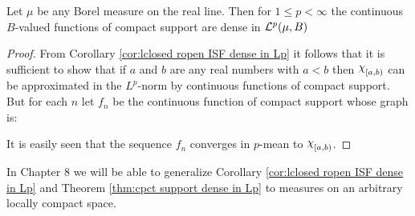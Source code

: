 \begin{theorem}
\label{thm:cpct support dense in Lp}
Let $\mu$ be any Borel measure on the real line. Then for $1\leq p<\infty$ the continuous $B$-valued functions of compact support are dense in ${\cal L}^p(\mu, B)$
\end{theorem}

\begin{proof}
From Corollary \ref{cor:lclosed ropen ISF dense in Lp} it follows that it is sufficient to show that if $a$ and $b$ are any real numbers with $a<b$ then $\idf{[a, b)}$ can be approximated in the $L^p$-norm by continuous functions of compact support. But for each $n$ let $f_n$ be the continuous function of compact support whose graph is:
\begin{center}
\end{center}
It is easily seen that the sequence $f_n$ converges in $p$-mean to $\idf{[a, b)}$.
\end{proof}

In Chapter 8 we will be able to generalize Corollary \ref{cor:lclosed ropen ISF dense in Lp} and Theorem \ref{thm:cpct support dense in Lp} to measures on an arbitrary locally compact space.